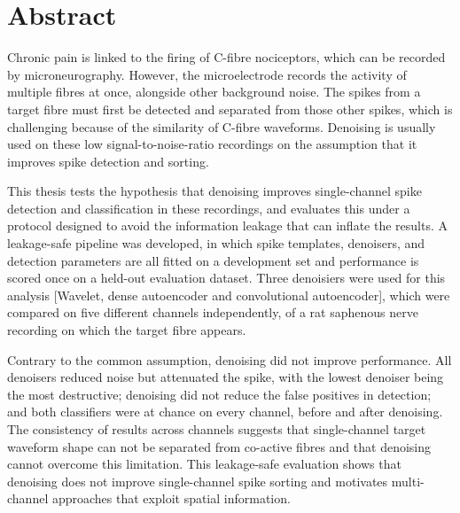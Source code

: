 \documentclass[ %
                    author={Rzan Alkabier},
                    supervisor={Dr. Zahraa Abdallah},
                    degree={MSc},
                     title={Denoising Extracellular Recording for Spike Detection and Classification on Single Channels},
                    subtitle={Does denoising improve detection and classification performance?},
                      type={},
                      year={2026}]{dissertation}
\begin{document}
\chapter*{Abstract}
Chronic pain is linked to the firing of C-fibre nociceptors, which can be recorded by microneurography. However, the microelectrode records the activity of multiple fibres at once, alongside other background noise. The spikes from a target fibre must first be detected and separated from those other spikes, which is challenging because of the similarity of C-fibre waveforms. Denoising is usually used on these low signal-to-noise-ratio recordings on the assumption that it improves spike detection and sorting. 
\bigskip

\noindent 
This thesis tests the hypothesis that denoising improves single-channel spike detection and classification in these recordings, and evaluates this under a protocol designed to avoid the information leakage that can inflate the results. A leakage-safe pipeline was developed, in which spike templates, denoisers, and detection parameters are all fitted on a development set and performance is scored once on a held-out evaluation dataset. Three denoisiers were used for this analysis [Wavelet, dense autoencoder and convolutional autoencoder], which were compared on five different channels independently, of a rat saphenous nerve recording on which the target fibre appears. 
\bigskip

\noindent
Contrary to the common assumption, denoising did not improve performance. All denoisers reduced noise but attenuated the spike, with the lowest denoiser being the most destructive; denoising did not reduce the false positives in detection; and both classifiers were at chance on every channel, before and after denoising. The consistency of results across channels suggests that single-channel target waveform shape can not be separated from co-active fibres and that denoising cannot overcome this limitation. This leakage-safe evaluation shows that denoising does not improve single-channel spike sorting and motivates multi-channel approaches that exploit spatial information.  


\end{document}
